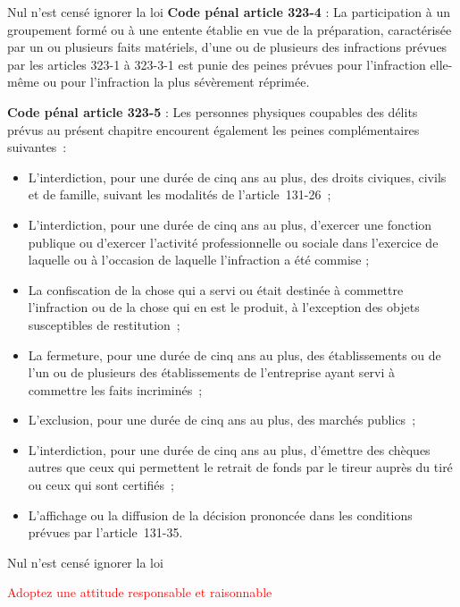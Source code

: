 \documentclass [xcolor=x11names,t] {beamer}
\begin{document}
\begin{frame}{Nul n'est censé ignorer la loi}
		\textbf{Code pénal article  323-4} :
		La participation à un groupement formé ou à une entente établie en vue de la préparation, caractérisée par un ou plusieurs faits matériels, d'une ou de plusieurs des infractions prévues par les articles 323-1 à 323-3-1 est punie des peines prévues pour l'infraction elle-même ou pour l'infraction la plus sévèrement réprimée.
		
		\textbf{Code pénal article 323-5} :
		 Les personnes physiques coupables des délits prévus au présent chapitre encourent également les peines complémentaires suivantes :
		\begin{itemize}
			\item L'interdiction, pour une durée de cinq ans au plus, des droits civiques, civils et de famille, suivant les modalités de l'article 131-26 ;
			\item L'interdiction, pour une durée de cinq ans au plus, d'exercer une fonction publique ou d'exercer l'activité professionnelle ou sociale dans l'exercice de laquelle ou à l'occasion de laquelle l'infraction a été commise ;
			\item La confiscation de la chose qui a servi ou était destinée à commettre l'infraction ou de la chose qui en est le produit, à l'exception des objets susceptibles de restitution ; 
			\item La fermeture, pour une durée de cinq ans au plus, des établissements ou de l'un ou de plusieurs des établissements de l'entreprise ayant servi à commettre les faits incriminés ;
			\item L'exclusion, pour une durée de cinq ans au plus, des marchés publics ;
			\item L'interdiction, pour une durée de cinq ans au plus, d'émettre des chèques autres que ceux qui permettent le retrait de fonds par le tireur auprès du tiré ou ceux qui sont certifiés ;
			\item L'affichage ou la diffusion de la décision prononcée dans les conditions prévues par l'article 131-35.
		\end{itemize}
		
	
\end{frame}

\begin{frame}{Nul n'est censé ignorer la loi}

\begin{center}
	\LARGE
	\textcolor{red}{Adoptez une attitude responsable et raisonnable}
	
\end{center}	
	
\end{frame}
\normalsize
\end{document}
